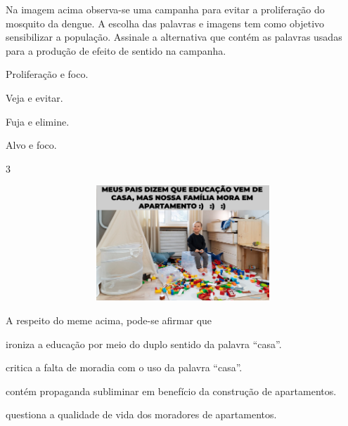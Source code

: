 
Na imagem acima observa-se uma campanha para evitar a proliferação do
mosquito da dengue. A escolha das palavras e imagens tem como objetivo
sensibilizar a população. Assinale a alternativa que contém as palavras
usadas para a produção de efeito de sentido na campanha. 

\begin{escolha}
  
  \item Proliferação e foco.
  
  \item Veja e evitar.
  
  \item Fuja e elimine.
  
  \item Alvo e foco. 

\end{escolha}


\num{3}

\includegraphics[width=5.90551in,height=1.70833in]{./imgSAEB_7_POR/media/image7.png}

A respeito do meme acima, pode-se afirmar que

\begin{escolha}
    
    \item ironiza a educação por meio do duplo sentido da palavra ``casa''.
    
    \item critica a falta de moradia com o uso da palavra ``casa''.
    
    \item contém propaganda subliminar em benefício da construção de apartamentos.
    
    \item questiona a qualidade de vida dos moradores de apartamentos.

\end{escolha}


